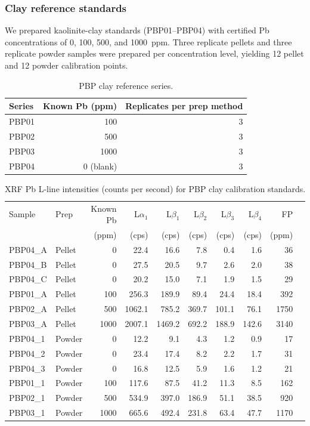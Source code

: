 \documentclass[journal=esthag,manuscript=suppinfo]{achemso}
\begin{document}
\subsubsection*{Clay reference standards}

We prepared kaolinite-clay standards (PBP01--PBP04) with certified Pb concentrations of 0, 100, 500, and 1000~ppm. Three replicate pellets and three replicate powder samples were prepared per concentration level, yielding 12 pellet and 12 powder calibration points.

\begin{table}[htbp]
\caption{PBP clay reference series.}
\label{tab:pbp_series}
\centering
\begin{tabular}{lrr}
\toprule
Series & Known Pb (ppm) & Replicates per prep method \\
\midrule
PBP01 & 100  & 3 \\
PBP02 & 500  & 3 \\
PBP03 & 1000 & 3 \\
PBP04 & 0 (blank) & 3 \\
\bottomrule
\end{tabular}
\end{table}

\begin{table}[htbp]
\caption{XRF Pb L-line intensities (counts per second) for PBP clay calibration standards.}
\label{tab:clay_intensities}
\centering
\footnotesize
\begin{tabular}{llrrrrrrrr}
\toprule
Sample & Prep & Known Pb & L$\alpha_1$ & L$\beta_1$ & L$\beta_2$ & L$\beta_3$ & L$\beta_4$ & FP \\
 &  & (ppm) & (cps) & (cps) & (cps) & (cps) & (cps) & (ppm) \\
\midrule
PBP04\_A & Pellet & 0    & 22.4 & 16.6 & 7.8  & 0.4  & 1.6  & 36 \\
PBP04\_B & Pellet & 0    & 27.5 & 20.5 & 9.7  & 2.6  & 2.0  & 38 \\
PBP04\_C & Pellet & 0    & 20.2 & 15.0 & 7.1  & 1.9  & 1.5  & 29 \\
PBP01\_A & Pellet & 100  & 256.3 & 189.9 & 89.4 & 24.4 & 18.4 & 392 \\
PBP02\_A & Pellet & 500  & 1062.1 & 785.2 & 369.7 & 101.1 & 76.1 & 1750 \\
PBP03\_A & Pellet & 1000 & 2007.1 & 1469.2 & 692.2 & 188.9 & 142.6 & 3140 \\
\midrule
PBP04\_1 & Powder & 0    & 12.2 & 9.1  & 4.3  & 1.2  & 0.9  & 17 \\
PBP04\_2 & Powder & 0    & 23.4 & 17.4 & 8.2  & 2.2  & 1.7  & 31 \\
PBP04\_3 & Powder & 0    & 16.8 & 12.5 & 5.9  & 1.6  & 1.2  & 21 \\
PBP01\_1 & Powder & 100  & 117.6 & 87.5 & 41.2 & 11.3 & 8.5  & 162 \\
PBP02\_1 & Powder & 500  & 534.9 & 397.0 & 186.9 & 51.1 & 38.5 & 920 \\
PBP03\_1 & Powder & 1000 & 665.6 & 492.4 & 231.8 & 63.4 & 47.7 & 1170 \\
\bottomrule
\end{tabular}
\end{table}
\end{document}
